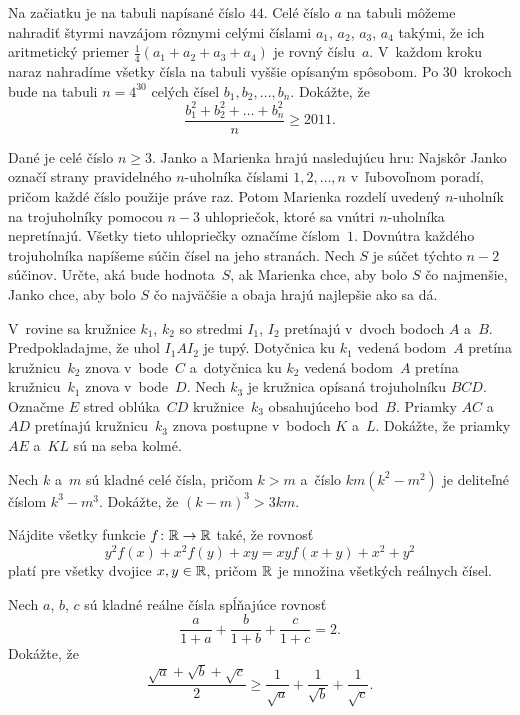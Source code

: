 {%
Na začiatku je na tabuli napísané číslo $44$. Celé číslo $a$ na tabuli môžeme nahradiť štyrmi navzájom rôznymi celými číslami $a_1$, $a_2$, $a_3$, $a_4$ takými, že ich aritmetický priemer $\frac 14(a_1+a_2+a_3+a_4)$ je rovný číslu~$a$. V~každom kroku naraz nahradíme všetky čísla na tabuli vyššie opísaným spôsobom. Po 30~krokoch bude na tabuli $n=4^{30}$ celých čísel $b_1,b_2,\dots,b_n$. Dokážte, že
$$
\frac{b_1^2+b_2^2+\ldots+b_n^2}{n} \ge 2011.
$$
}

{%
Dané je celé číslo $n\ge 3$. Janko a Marienka hrajú nasledujúcu hru: Najskôr Janko označí strany pravidelného $n$-uholníka číslami $1,2,\dots,n$ v~ľubovoľnom poradí, pričom každé číslo použije práve raz. Potom Marienka rozdelí uvedený $n$-uholník na trojuholníky pomocou $n-3$ uhlopriečok, ktoré sa vnútri $n$-uholníka nepretínajú. Všetky tieto uhlopriečky označíme číslom~$1$. Dovnútra každého trojuholníka napíšeme súčin čísel na jeho stranách. Nech $S$ je súčet týchto $n-2$ súčinov. Určte, aká bude hodnota~$S$, ak Marienka chce, aby bolo $S$ čo najmenšie, Janko chce, aby bolo $S$ čo najväčšie a obaja hrajú najlepšie ako sa dá.
}

{%
V~rovine sa kružnice $k_1$, $k_2$ so stredmi $I_1$, $I_2$ pretínajú v~dvoch bodoch $A$ a~$B$. Predpokladajme, že uhol $I_1AI_2$ je tupý. Dotyčnica ku $k_1$ vedená bodom~$A$ pretína kružnicu~$k_2$ znova v~bode~$C$ a~dotyčnica ku $k_2$ vedená bodom~$A$ pretína kružnicu~$k_1$ znova v~bode~$D$.
Nech $k_3$ je kružnica opísaná trojuholníku $BCD$. Označme $E$ stred oblúka~$CD$ kružnice~$k_3$ obsahujúceho bod~$B$. Priamky $AC$ a~$AD$ pretínajú kružnicu~$k_3$ znova postupne v~bodoch $K$ a~$L$. Dokážte, že priamky $AE$ a~$KL$ sú na seba kolmé.}

{%
Nech $k$ a~$m$ sú kladné celé čísla, pričom $k>m$ a~číslo
$km(k^2-m^2)$ je deliteľné číslom $k^3-m^3$. Dokážte, že $(k-m)^3>3km$.}

{%
Nájdite všetky funkcie $f\colon\Bbb R\to\Bbb R$ také, že rovnosť
$$
y^2 f(x) + x^2 f(y) + xy = xy f(x+y) + x^2 + y^2
$$
platí pre všetky dvojice $x,y\in\Bbb R$, pričom $\Bbb R$ je množina všetkých reálnych čísel.}

{%
Nech $a$, $b$, $c$ sú kladné reálne čísla spĺňajúce rovnosť
$$
\frac{a}{1+a}+\frac{b}{1+b}+\frac{c}{1+c}=2.
$$
Dokážte, že
$$
\frac{\sqrt{a}+\sqrt{b}+\sqrt{c}}{2}\ge \frac{1}{\sqrt{a}}+\frac{1}{\sqrt{b}}+\frac{1}{\sqrt{c}}.
$$
}

